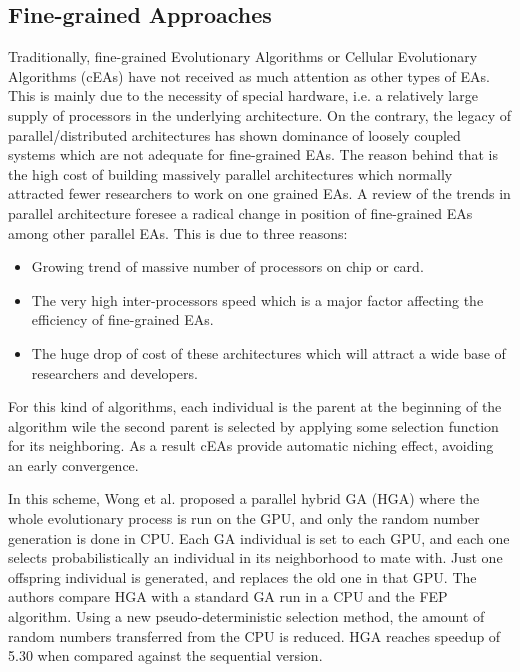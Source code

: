 \documentclass[prodmode,acmtecs]{acmsmall}
\begin{document}
\subsection{Fine-grained Approaches}

Traditionally, fine-grained Evolutionary Algorithms or Cellular Evolutionary Algorithms (cEAs) have not received as much attention as other types of EAs. This is mainly due to the necessity of special hardware, i.e. a relatively large supply of processors in the underlying architecture. On the contrary, the legacy of parallel/distributed architectures has shown dominance of loosely coupled systems which are not adequate for fine-grained EAs. The reason behind that is the high cost of building massively parallel architectures which normally attracted fewer researchers to work on one grained EAs. A review of the trends in parallel architecture foresee a radical change in position of fine-grained EAs among other parallel EAs. This is due to three reasons:

\begin{itemize}
 \item Growing trend of massive number of processors on chip or card. 
\item The very high inter-processors speed which is a major factor affecting the efficiency of fine-grained EAs. 
\item The huge drop of cost of these architectures which will attract a wide base of researchers and developers.
\end{itemize}

For this kind of algorithms, each individual is the parent at the beginning of the algorithm wile the second parent is selected by applying some selection function for its neighboring. As a result cEAs provide automatic niching effect, avoiding an early convergence. 


In this scheme, Wong et al. \cite{man-leung-wong-parallel-2006,wong-implementation-2009} proposed a parallel hybrid GA (HGA) where the whole evolutionary process is run on the GPU, and only the random number generation is done in CPU. Each GA individual is set to each GPU, and each one selects probabilistically an individual in its neighborhood to mate with. Just one offspring individual is generated, and replaces the old one in that GPU. The authors compare HGA with a standard GA run in a CPU and the FEP \cite{man-leung-wong-parallel-2005} algorithm. Using a new pseudo-deterministic selection method, the amount of random numbers transferred from the CPU is reduced. HGA reaches speedup of 5.30 when compared against the sequential version.
\end{document}
